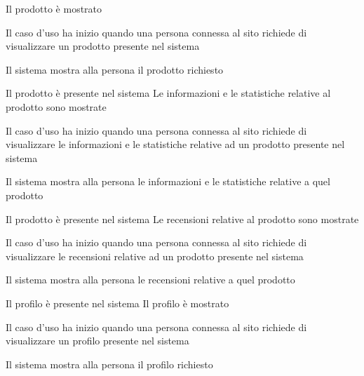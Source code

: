 \tabcuvspace

{Il prodotto è mostrato}
{\begin{enumCU}
	\item Il caso d'uso ha inizio quando una persona connessa al sito richiede di visualizzare un prodotto presente nel sistema
	\item Il sistema mostra alla persona il prodotto richiesto
\end{enumCU}}

\tabcuvspace

{Il prodotto è presente nel sistema}
{Le informazioni e le statistiche relative al prodotto sono mostrate}
{\begin{enumCU}
	\item Il caso d'uso ha inizio quando una persona connessa al sito richiede di visualizzare le informazioni e le statistiche relative ad un prodotto presente nel sistema
	\item Il sistema mostra alla persona le informazioni e le statistiche relative a quel prodotto
\end{enumCU}}

\tabcuvspace

{Il prodotto è presente nel sistema}
{Le recensioni relative al prodotto sono mostrate}
{\begin{enumCU}
	\item Il caso d'uso ha inizio quando una persona connessa al sito richiede di visualizzare le recensioni relative ad un prodotto presente nel sistema
	\item Il sistema mostra alla persona le recensioni relative a quel prodotto
\end{enumCU}}

\tabcuvspace

%

{Il profilo è presente nel sistema}
{Il profilo è mostrato}
{\begin{enumCU}
	\item Il caso d'uso ha inizio quando una persona connessa al sito richiede di visualizzare un profilo presente nel sistema
	\item Il sistema mostra alla persona il profilo richiesto
\end{enumCU}}


